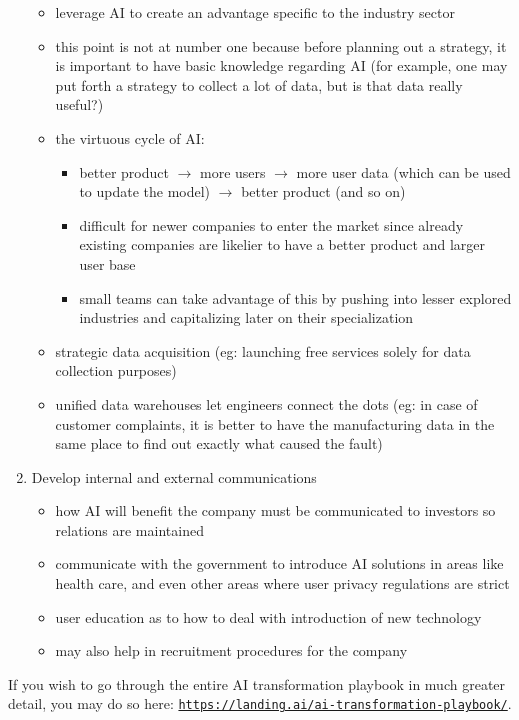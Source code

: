 \documentclass{article}[a4paper,12pt]
\theoremstyle{definition}
\begin{document}
\begin{enumerate}
	\begin{itemize}
		\item leverage AI to create an advantage specific to the industry sector
		\item this point is not at number one because before planning out a strategy, it is important to have basic knowledge regarding AI (for example, one may put forth a strategy to collect a lot of data, but is that data really useful?)
		\item the virtuous cycle of AI:
		\begin{itemize}
			\item better product $\rightarrow$ more users $\rightarrow$ more user data (which can be used to update the model) $\rightarrow$ better product (and so on)
			\item difficult for newer companies to enter the market since already existing companies are likelier to have a better product and larger user base
			\item small teams can take advantage of this by pushing into lesser explored industries and capitalizing later on their specialization
		\end{itemize}
		\item strategic data acquisition (eg: launching free services solely for data collection purposes)
		\item unified data warehouses let engineers connect the dots (eg: in case of customer complaints, it is better to have the manufacturing data in the same place to find out exactly what caused the fault)
	\end{itemize}
	\item Develop internal and external communications
	\begin{itemize}
		\item how AI will benefit the company must be communicated to investors so relations are maintained
		\item communicate with the government to introduce AI solutions in areas like health care, and even other areas where user privacy regulations are strict
		\item user education as to how to deal with introduction of new technology
		\item may also help in recruitment procedures for the company
	\end{itemize}
\end{enumerate}
If you wish to go through the entire AI transformation playbook in much greater detail, you may do so here: \texttt{\href{https://landing.ai/ai-transformation-playbook/}{https://landing.ai/ai-transformation-playbook/}}.
\end{document}
